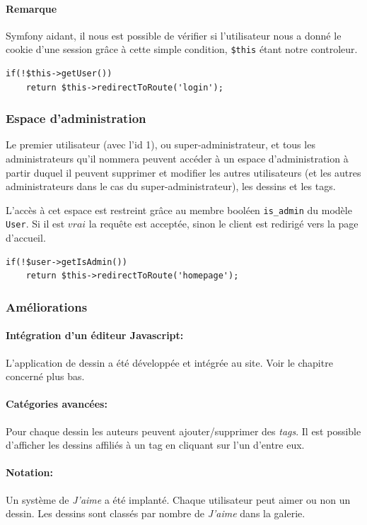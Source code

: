 \documentclass[a4paper]{article}
\begin{document}
\paragraph{Remarque}

Symfony aidant, il nous est possible de vérifier si l'utilisateur nous a donné le cookie d'une session grâce à cette simple condition, \texttt{\$this} étant notre controleur.
\begin{lstlisting}
if(!$this->getUser())
	return $this->redirectToRoute('login');
\end{lstlisting}

\subsubsection{Espace d'administration}
Le premier utilisateur (avec l'id 1), ou super-administrateur, et tous les administrateurs qu'il nommera peuvent accéder à un espace d'administration à partir duquel il peuvent supprimer et modifier les autres utilisateurs (et les autres administrateurs dans le cas du super-administrateur), les dessins et les tags.

L'accès à cet espace est restreint grâce au membre booléen \texttt{is\_admin} du modèle \texttt{User}. Si il est $vrai$ la requête est acceptée, sinon le client est redirigé vers la page d'accueil.

\begin{lstlisting}
if(!$user->getIsAdmin())
	return $this->redirectToRoute('homepage');
\end{lstlisting}

\subsubsection{Améliorations}
\paragraph{Intégration d'un éditeur Javascript: }L'application de dessin a été développée et intégrée au site. Voir le chapitre concerné plus bas.
\paragraph{Catégories avancées: }Pour chaque dessin les auteurs peuvent ajouter/supprimer des \textit{tags}. Il est possible d'afficher les dessins affiliés à un tag en cliquant sur l'un d'entre eux.
\paragraph{Notation: }Un système de \textit{J'aime} a été implanté. Chaque utilisateur peut aimer ou non un dessin. Les dessins sont classés par nombre de \textit{J'aime} dans la galerie.
\end{document}
